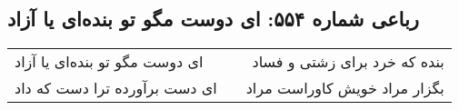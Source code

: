 \begin{center}
\section*{رباعی شماره ۵۵۴: ای دوست مگو تو بنده‌ای یا آزاد}
\label{sec:0554}
\begin{longtable}{l p{0.5cm} r}
ای دوست مگو تو بنده‌ای یا آزاد
&&
بنده که خرد برای زشتی و فساد
\\
ای دست برآورده ترا دست که داد
&&
بگزار مراد خویش کاوراست مراد
\\
\end{longtable}
\end{center}
